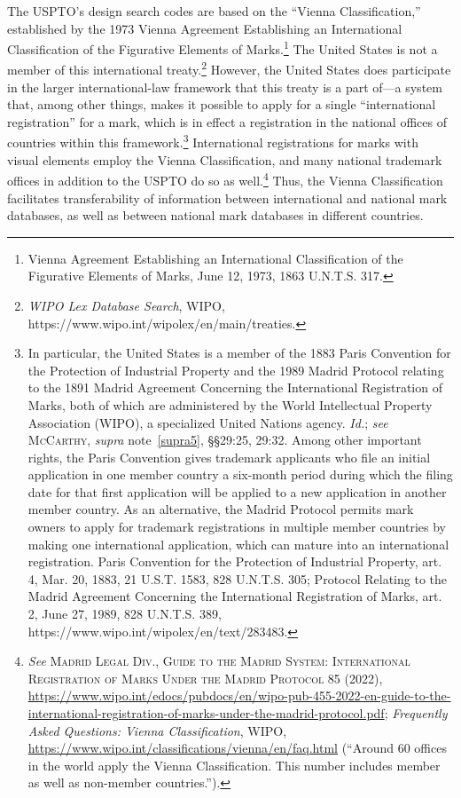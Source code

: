 \documentclass[letterpaper, 11pt, oneside]{article}
\begin{document}
The USPTO's design search codes are based on the ``Vienna Classification,'' established by the 1973 Vienna Agreement Establishing an International Classification of the Figurative Elements of Marks.\footnote{Vienna Agreement Establishing an International Classification of the Figurative Elements of Marks, June 12, 1973, 1863 U.N.T.S. 317.} The United States is not a member of this international treaty.\footnote{\textit{WIPO Lex Database Search}, WIPO, https://www.wipo.int/wipolex/en/main/treaties.} However, the United States does participate in the larger international-law framework that this treaty is a part of—a system that, among other things, makes it possible to apply for a single ``international registration'' for a mark, which is in effect a registration in the national offices of countries within this framework.\footnote{In particular, the United States is a member of the 1883 Paris Convention for the Protection of Industrial Property and the 1989 Madrid Protocol relating to the 1891 Madrid Agreement Concerning the International Registration of Marks, both of which are administered by the World Intellectual Property Association (WIPO), a specialized United Nations agency. \textit{Id.}; \textit{see} \textsc{McCarthy}, \textit{supra} note~\ref{supra5}, \S\S 29:25, 29:32. Among other important rights, the Paris Convention gives trademark applicants who file an initial application in one member country a six-month period during which the filing date for that first application will be applied to a new application in another member country. As an alternative, the Madrid Protocol permits mark owners to apply for trademark registrations in multiple member countries by making one international application, which can mature into an international registration. Paris Convention for the Protection of Industrial Property, art. 4, Mar. 20, 1883, 21 U.S.T. 1583, 828 U.N.T.S. 305; Protocol Relating to the Madrid Agreement Concerning the International Registration of Marks, art. 2, June 27, 1989, 828 U.N.T.S. 389, https://www.wipo.int/wipolex/en/text/283483.} International registrations for marks with visual elements employ the Vienna Classification, and many national trademark offices in addition to the USPTO do so as well.\footnote{\textit{See} \textsc{Madrid Legal Div., Guide to the Madrid System: International Registration of Marks Under the Madrid Protocol} 85 (2022), \url{https://www.wipo.int/edocs/pubdocs/en/wipo-pub-455-2022-en-guide-to-the-international-registration-of-marks-under-the-madrid-protocol.pdf}; \textit{Frequently Asked Questions: Vienna Classification}, WIPO, \url{https://www.wipo.int/classifications/vienna/en/faq.html} (``Around 60 offices in the world apply the Vienna Classification. This number includes member as well as non-member countries.'').} Thus, the Vienna Classification facilitates transferability of information between international and national mark databases, as well as between national mark databases in different countries.
\end{document}
